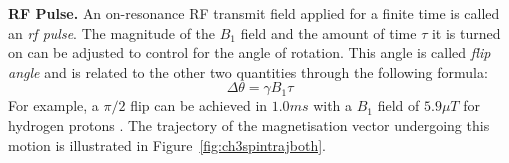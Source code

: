 \hfill

\textbf{RF Pulse.} \label{app:rfpulse}
An on-resonance RF transmit field applied for a finite time is called an \textit{rf pulse}. 
The magnitude of the $B_1$ field and the amount of time $\tau$ it is turned on can be adjusted to control for the angle of rotation. 
This angle is called \textit{flip angle} and is related to the other two quantities through the following formula:
\begin{equation}\label{eq:331}
    \Delta \theta = \gamma B_1 \tau
\end{equation}
For example, a $\pi/2$ flip can be achieved in $1.0 ms$ with a $B_1$ field of $5.9 \mu T$ for hydrogen protons \cite{Haacke1999}. 
The trajectory of the magnetisation vector undergoing this motion is illustrated in Figure~\ref{fig:ch3spintrajboth}.

